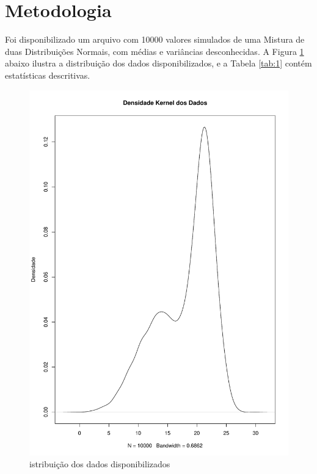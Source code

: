 \documentclass[
	article,			%
	11pt,				%
	oneside,			%
	a4paper,			%
	english,			%
	brazil,				%
	sumario=tradicional
	]{abntex2}
\begin{document}
\section{Metodologia}
Foi disponibilizado um arquivo com 10000 valores simulados de uma Mistura de duas Distribuições Normais, com médias e variâncias desconhecidas. A Figura \ref{fig:exp1} abaixo ilustra a distribuição dos dados disponibilizados, e a Tabela \ref{tab:1} contém estatísticas descritivas.

\begin{figure}[t]
\centering
\includegraphics[scale = 0.6]{exp1}
\caption{istribuição dos dados disponibilizados}
\label{fig:exp1}
\end{figure}
\end{document}
